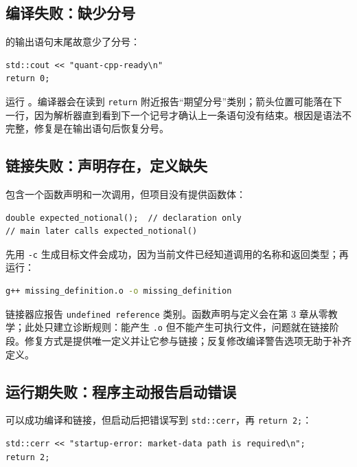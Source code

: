 \subsection{编译失败：缺少分号}

 的输出语句末尾故意少了分号：

\begin{lstlisting}
std::cout << "quant-cpp-ready\n"
return 0;
\end{lstlisting}

运行 。编译器会在读到 \texttt{return} 附近报告“期望分号”类别；箭头位置可能落在下一行，因为解析器直到看到下一个记号才确认上一条语句没有结束。根因是语法不完整，修复是在输出语句后恢复分号。

\subsection{链接失败：声明存在，定义缺失}

 包含一个函数声明和一次调用，但项目没有提供函数体：

\begin{lstlisting}
double expected_notional();  // declaration only
// main later calls expected_notional()
\end{lstlisting}

先用 \texttt{-c} 生成目标文件会成功，因为当前文件已经知道调用的名称和返回类型；再运行：

\begin{lstlisting}[language=bash,numbers=none]
g++ missing_definition.o -o missing_definition
\end{lstlisting}

链接器应报告 \texttt{undefined reference} 类别。函数声明与定义会在第 3 章从零教学；此处只建立诊断规则：能产生 \texttt{.o} 但不能产生可执行文件，问题就在链接阶段。修复方式是提供唯一定义并让它参与链接；反复修改编译警告选项无助于补齐定义。

\subsection{运行期失败：程序主动报告启动错误}

 可以成功编译和链接，但启动后把错误写到 \texttt{std::cerr}，再 \texttt{return 2;}：

\begin{lstlisting}
std::cerr << "startup-error: market-data path is required\n";
return 2;
\end{lstlisting}

